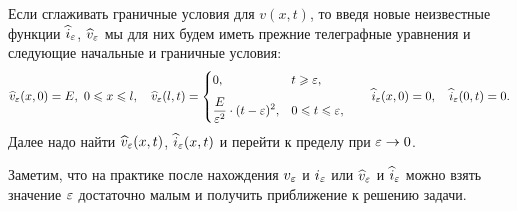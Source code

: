 \begin{enumerateD}
	Если сглаживать граничные условия для $v(x,t)$, то введя новые неизвестные функции $\widehat{i}_{\varepsilon}$, $\widehat{v}_{\varepsilon}$ мы для них будем иметь прежние телеграфные уравнения и следующие начальные и граничные условия:
	\begin{equation*}
		\hfill \widehat{v}_{\eps}(x,0)=E,\ 0\leqslant x\leqslant l,\quad \widehat{v}_{\eps}(l,t)=\begin{cases}
			0,& t\geqslant\eps,\\[7pt]
			\displaystyle \frac{E}{\eps^2}\cdot(t-\eps)^2,&0\leqslant t\leqslant\eps,
		\end{cases}\qquad \widehat{i}_{\eps}(x,0)=0,\quad\widehat{i}_{\eps}(0,t)=0. \hfill
	\end{equation*} 
	Далее надо найти $\widehat{v}_{\varepsilon}(x,t)$, $\widehat{i}_{\varepsilon}(x,t)$ и перейти к пределу при $\varepsilon\to0$.
\end{enumerateD}  

Заметим, что на практике после нахождения $v_{\varepsilon}$ и $i_{\varepsilon}$ или $\widehat{v}_{\varepsilon}$ и $\widehat{i}_{\varepsilon}$ можно взять значение $\varepsilon$ достаточно малым и получить приближение к решению задачи.